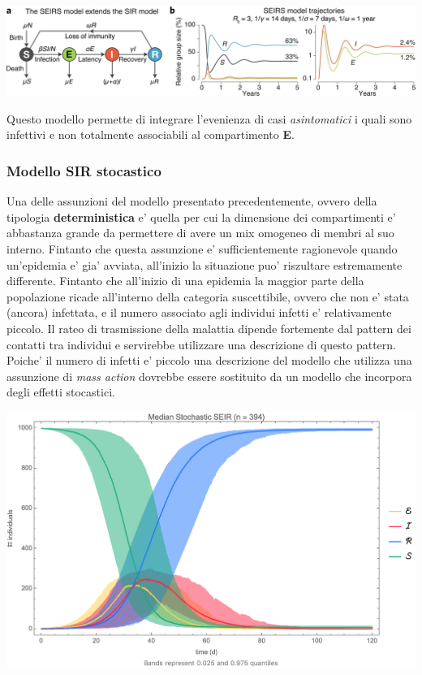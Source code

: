 \begin{minipage}{\linewidth}
    \centering
    \includegraphics[width=\textwidth]{img/41592_2020_856_Fig1_HTML.png}
    \label{fig:SEIRS_model}
\end{minipage}

Questo modello permette di integrare l'evenienza di casi \emph{asintomatici} i quali sono infettivi e non totalmente 
associabili al compartimento \textbf{E}.

\subsubsection{Modello SIR stocastico}
Una delle assunzioni del modello presentato precedentemente, ovvero della tipologia \textbf{deterministica} e' quella per cui la dimensione 
dei compartimenti e' abbastanza grande da permettere di avere un mix omogeneo di membri al suo interno. Fintanto che questa assunzione e' sufficientemente
ragionevole quando un'epidemia e' gia' avviata, all'inizio la situazione puo' riszultare estremamente differente. Fintanto che all'inizio di una 
epidemia la maggior parte della popolazione ricade all'interno della categoria suscettibile, ovvero che non e' stata (ancora) infettata, e il numero associato 
agli individui infetti e' relativamente piccolo. Il rateo di trasmissione della malattia dipende fortemente dal pattern dei contatti tra individui e servirebbe utilizzare 
una descrizione di questo pattern. Poiche' il numero di infetti e' piccolo una descrizione del modello che utilizza una assunzione di \emph{mass action} dovrebbe essere 
sostituito da un modello che incorpora degli effetti stocastici.

\begin{minipage}{\linewidth}
    \centering
    \includegraphics[width=\textwidth]{img/stochastic_SEIR.png}
    \label{fig:stochastic_SEIR_model}
\end{minipage}
